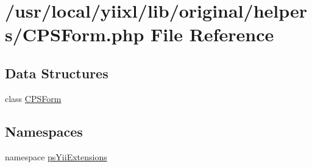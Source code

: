 \hypertarget{CPSForm_8php}{
\section{/usr/local/yiixl/lib/original/helpers/CPSForm.php File Reference}
\label{CPSForm_8php}
}
\subsection*{Data Structures}
\begin{DoxyCompactItemize}
\item 
class \hyperlink{classCPSForm}{CPSForm}
\end{DoxyCompactItemize}
\subsection*{Namespaces}
\begin{DoxyCompactItemize}
\item 
namespace \hyperlink{namespacepsYiiExtensions}{psYiiExtensions}
\end{DoxyCompactItemize}
